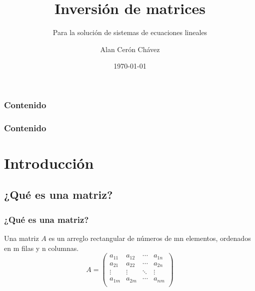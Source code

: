 \documentclass{beamer}
\title{Inversión de matrices}
\subtitle{Para la solución de sistemas de ecuaciones lineales}
\author{Alan Cerón Chávez}
\institute{FES Acatlán - UNAM}
\date{\today}
\begin{document}
    \begin{frame}
        \titlepage
    \end{frame}

    \begin{frame}
        \frametitle{Contenido}
        \tableofcontents[sections=1-2]
    \end{frame}

    \begin{frame}
        \frametitle{Contenido}
        \tableofcontents[sections=3-5]
    \end{frame}

    \section{Introducción}
    \subsection{¿Qué es una matriz?}

    \begin{frame}
        \frametitle{¿Qué es una matriz?}
        Una matriz $A$ es un arreglo rectangular de números de mn elementos, ordenados en m filas y n columnas.
        $$
        A=
            \begin{pmatrix}
                a_{11} & a_{12} & \cdots & a_{1n} \\
                a_{21} & a_{22} & \cdots & a_{2n} \\
                \vdots & \vdots & \ddots & \vdots \\
                a_{1m} & a_{2m} & \cdots & a_{nm} \\
            \end{pmatrix}
        $$
    \end{frame}
\end{document}
